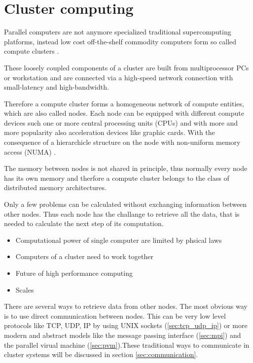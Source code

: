 \section{Cluster computing}
Parallel computers are not anymore specialized traditional
supercomputing platforms, instead low cost off-the-shelf commodity
computers form so called compute clusters \cite{ref:hpcc1}.

These loosely coupled components of a cluster are built from
multiprocessor PCs or workstation and are connected via a high-speed
network connection with small-latency and high-bandwidth.

Therefore a compute cluster forms a homogeneous network of compute
entities, which are also called nodes. Each node can be equipped with
different compute devices such one or more central processing units (CPUs) and with more and
more popularity also acceleration devices like graphic cards. With the
consequence of a hierarchicle structure on the node with non-uniform
memory access (NUMA) \cite[numa]{ref:numa}.

The memory between nodes is not shared in principle, thus normally
every node has its own memory and therfore a compute cluster belongs
to the class of distributed memory architectures.

Only a few problems can be calculated without exchanging information
between other nodes. Thus each node has the challange to retrieve all
the data, that is needed to calculate the next step of its
computation.

\begin{itemize}
\item Computational power of single computer are limited by 
  phsical laws
\item Computers of a cluster need to work together
\item Future of high performance computing \cite{ref:hpc}
\item Scales
\end{itemize}

There are several ways to retrieve data from other nodes. The most
obvious way is to use direct communication between nodes. This can be
very low level protocols like TCP, UDP, IP by using UNIX sockets
(\ref{sec:tcp_udp_ip}) or more modern and abstract models like the
message passing interface (\ref{sec:mpi}) and the parallel virual
machine (\ref{sec:pvm}).These traditional ways to communicate in
cluster systems will be discussed in section \ref{sec:communication}.

